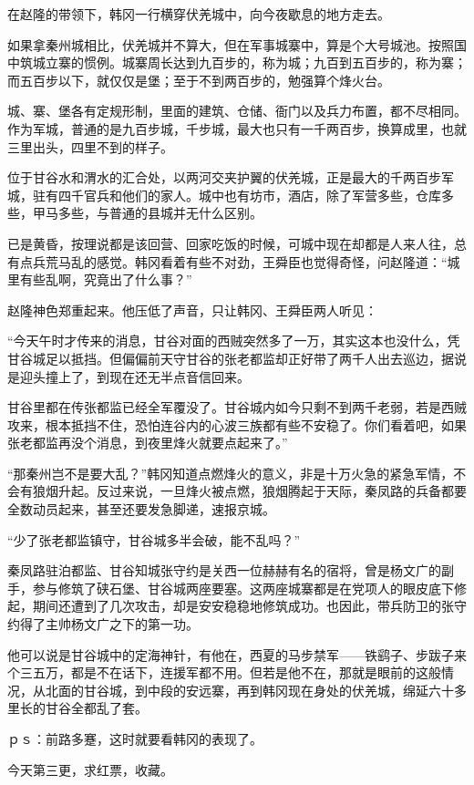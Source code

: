 在赵隆的带领下，韩冈一行横穿伏羌城中，向今夜歇息的地方走去。

如果拿秦州城相比，伏羌城并不算大，但在军事城寨中，算是个大号城池。按照国中筑城立寨的惯例。城寨周长达到九百步的，称为城；九百到五百步的，称为寨；而五百步以下，就仅仅是堡；至于不到两百步的，勉强算个烽火台。

城、寨、堡各有定规形制，里面的建筑、仓储、衙门以及兵力布置，都不尽相同。作为军城，普通的是九百步城，千步城，最大也只有一千两百步，换算成里，也就三里出头，四里不到的样子。

位于甘谷水和渭水的汇合处，以两河交夹护翼的伏羌城，正是最大的千两百步军城，驻有四千官兵和他们的家人。城中也有坊市，酒店，除了军营多些，仓库多些，甲马多些，与普通的县城并无什么区别。

已是黄昏，按理说都是该回营、回家吃饭的时候，可城中现在却都是人来人往，总有点兵荒马乱的感觉。韩冈看着有些不对劲，王舜臣也觉得奇怪，问赵隆道：“城里有些乱啊，究竟出了什么事？”

赵隆神色郑重起来。他压低了声音，只让韩冈、王舜臣两人听见：

“今天午时才传来的消息，甘谷对面的西贼突然多了一万，其实这本也没什么，凭甘谷城足以抵挡。但偏偏前天守甘谷的张老都监却正好带了两千人出去巡边，据说是迎头撞上了，到现在还无半点音信回来。

甘谷里都在传张都监已经全军覆没了。甘谷城内如今只剩不到两千老弱，若是西贼攻来，根本抵挡不住，恐怕连谷内的心波三族都有些不安稳了。你们看着吧，如果张老都监再没个消息，到夜里烽火就要点起来了。”

“那秦州岂不是要大乱？”韩冈知道点燃烽火的意义，非是十万火急的紧急军情，不会有狼烟升起。反过来说，一旦烽火被点燃，狼烟腾起于天际，秦凤路的兵备都要全数动员起来，甚至还要发急脚递，速报京城。

“少了张老都监镇守，甘谷城多半会破，能不乱吗？”

秦凤路驻泊都监、甘谷知城张守约是关西一位赫赫有名的宿将，曾是杨文广的副手，参与修筑了硖石堡、甘谷城两座要塞。这两座城寨都是在党项人的眼皮底下修起，期间还遭到了几次攻击，却是安安稳稳地修筑成功。也因此，带兵防卫的张守约得了主帅杨文广之下的第一功。

他可以说是甘谷城中的定海神针，有他在，西夏的马步禁军——铁鹞子、步跋子来个三五万，都是不在话下，连援军都不用。但若是他不在，那就是眼前的这般情况，从北面的甘谷城，到中段的安远寨，再到韩冈现在身处的伏羌城，绵延六十多里长的甘谷全都乱了套。

ｐｓ：前路多蹇，这时就要看韩冈的表现了。

今天第三更，求红票，收藏。

